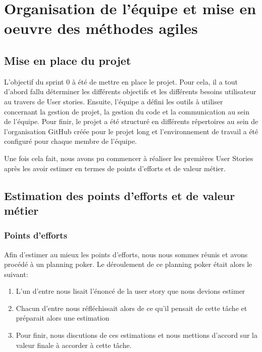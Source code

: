 \documentclass[11pt]{report}
\begin{document}
\chapter{Organisation de l'équipe et mise en oeuvre des méthodes agiles}

\section{Mise en place du projet}
L'objectif du sprint 0 à été de mettre en place le projet. Pour cela, il a tout d'abord fallu
déterminer les différents objectifs et les différents besoins utilisateur au travers de User stories. Ensuite, l'équipe a défini
les outils à utiliser concernant la gestion de projet, la gestion du code et la communication au sein de l'équipe.
Pour finir, le projet a été structuré en différents répertoires au sein de l'organisation GitHub créée pour le projet long
et l'environnement de travail a été configuré pour chaque membre de l'équipe.\newline

Une fois cela fait, nous avons pu commencer à réaliser les premières User Stories après les avoir estimer en termes de points d'efforts et de valeur métier.

\section{Estimation des points d'efforts et de valeur métier}

\subsection{Points d'efforts}

Afin d'estimer au mieux les points d'efforts, nous nous sommes réunis et avons procédé à un planning poker. Le déroulement de ce planning poker était alors le suivant:

\begin{enumerate}
  \item L'un d'entre nous lisait l'énoncé de la user story que nous devions estimer
  \item Chacun d'entre nous réfléchissait alors de ce qu'il pensait de cette tâche et préparait alors une estimation
  \item Pour finir, nous discutions de ces estimations et nous mettions d'accord sur la valeur finale à accorder à cette tâche.
\end{enumerate}
\end{document}
